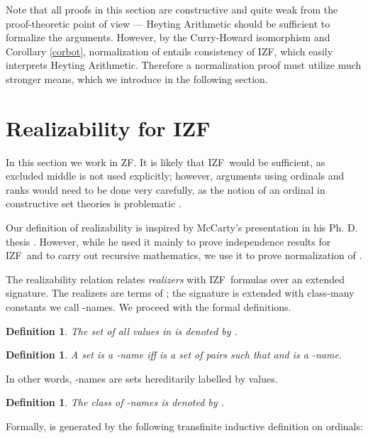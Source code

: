 \documentclass{LMCS}
\newtheorem{definition}[thm]{Definition}
\newcommand{\izfc}{IZF}
\newcommand{\izfr}{IZF}
\newcommand{\iizfr}{IZF}
\begin{document}
Note that all proofs in this section are constructive and quite weak from
the proof-theoretic point of view --- Heyting Arithmetic should be
sufficient to formalize the arguments. However, by the Curry-Howard isomorphism
and Corollary \ref{corbot}, normalization of  entails consistency of \iizfr,
which easily interprets Heyting Arithmetic. Therefore a normalization
proof must utilize much stronger means, which we introduce in the following
section. 

\newcommand\vl{V^{\lambda}}
\newcommand\vla{\vl_\alpha}
\newcommand\vlb{\vl_\beta}

\section{Realizability for \iizfr}\label{izfreal}

In this section we work in ZF. It is likely that \izfc\ would be sufficient, as excluded middle is not used explicitly; however, arguments using ordinals
and ranks would need to be done very carefully, as the notion of an ordinal
in constructive set theories is problematic \cite{powell, taylor96}.

Our definition of realizability is inspired by McCarty's presentation
in his Ph. D. thesis \cite{mccarty}. However, while he used it mainly to
prove independence results for \izfc\ and to carry out recursive mathematics,
we use it to prove normalization of .

The realizability relation  relates \emph{realizers} with \izfr\
formulas over an extended signature. The realizers are terms of ; the
signature is extended with class-many constants we call -names. We
proceed with the formal definitions.

\begin{definition}
The set of all values in  is denoted by . 
\end{definition}

\begin{definition}
A set  is a -name iff  is a set of pairs  such that
 and  is a -name.
\end{definition}

In other words, -names are sets hereditarily labelled by  values.

\begin{definition}
The class of -names is denoted by .
\end{definition}

Formally,  is generated by the following transfinite inductive
definition on ordinals:
\end{document}
